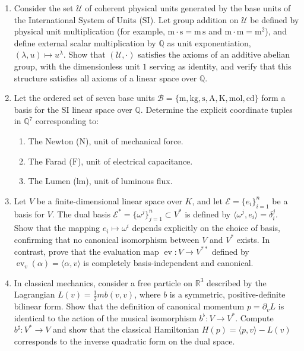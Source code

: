 \documentclass[11pt,a4paper]{article}
\newcommand{\R}{\mathbb{R}}
\newcommand{\Q}{\mathbb{Q}}
\newcommand{\ev}{\operatorname{ev}}
\begin{document}
\begin{enumerate}
  \item Consider the set $\mathcal{U}$ of coherent physical units generated by
    the base units of the International System of Units (SI).
    Let group addition on $\mathcal{U}$ be defined by physical unit
    multiplication (for example, $\mathrm{m} \cdot \mathrm{s} = \mathrm{m\,s}$
    and $\mathrm{m} \cdot \mathrm{m} = \mathrm{m}^2$), and define external
    scalar multiplication by $\Q$ as unit exponentiation,
    $(\lambda, u) \mapsto u^\lambda$.
    Show that $(\mathcal{U}, \cdot)$ satisfies the axioms of an additive
    abelian group, with the dimensionless unit $1$ serving as identity, and
    verify that this structure satisfies all axioms of a linear space over $\Q$.

  \item Let the ordered set of seven base units $\mathcal{B} = \{\mathrm{m},
      \mathrm{kg}, \mathrm{s}, \mathrm{A}, \mathrm{K}, \mathrm{mol},
    \mathrm{cd}\}$ form a basis for the SI linear space over $\Q$.
    Determine the explicit coordinate tuples in $\Q^7$ corresponding to:
    \begin{enumerate}
      \item The Newton ($\mathrm{N}$), unit of mechanical force.
      \item The Farad ($\mathrm{F}$), unit of electrical capacitance.
      \item The Lumen ($\mathrm{lm}$), unit of luminous flux.
    \end{enumerate}

  \item Let $V$ be a finite-dimensional linear space over $K$, and let
    $\mathcal{E} = \{e_i\}_{i=1}^n$ be a basis for $V$.
    The dual basis $\mathcal{E}^* = \{\omega^j\}_{j=1}^n \subset V^*$ is
    defined by $\langle \omega^j, e_i \rangle = \delta^j_i$.
    Show that the mapping $e_i \mapsto \omega^i$ depends explicitly on the
    choice of basis, confirming that no canonical isomorphism between $V$ and
    $V^*$ exists.
    In contrast, prove that the evaluation map $\ev : V \to V^{**}$ defined by
    $\ev_v(\alpha) = \langle \alpha, v \rangle$ is completely basis-independent
    and canonical.

  \item In classical mechanics, consider a free particle on $\R^3$ described by
    the Lagrangian $L(v) = \frac{1}{2} m b(v, v)$, where $b$ is a symmetric,
    positive-definite bilinear form.
    Show that the definition of canonical momentum $p = \partial_v L$ is
    identical to the action of the musical isomorphism $b^\flat : V \to V^*$.
    Compute $b^\sharp : V^* \to V$ and show that the classical Hamiltonian
    $H(p) = \langle p, v \rangle - L(v)$ corresponds to the inverse quadratic
    form on the dual space.


\end{enumerate}
\end{document}
